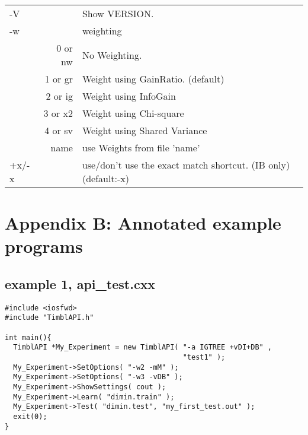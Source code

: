 \begin{tabular}{|l|r|l|}
-V & & Show VERSION. \\
-w &  & weighting \\
   & 0 or nw & No Weighting. \\
   & 1 or gr & Weight using GainRatio. (default) \\
   & 2 or ig & Weight using InfoGain \\
   & 3 or x2 & Weight using Chi-square \\
   & 4 or sv & Weight using Shared Variance \\
   & name & use Weights from file 'name' \\
+x/-x & & use/don't use the exact match shortcut.
 (IB only) (default:-x)\\
\hline
\end{tabular}

\clearpage
\section{Appendix B: Annotated example programs}

\subsection{example 1, api\_test.cxx}
\begin{verbatim}	
#include <iosfwd>
#include "TimblAPI.h"

int main(){
  TimblAPI *My_Experiment = new TimblAPI( "-a IGTREE +vDI+DB" , 
                                          "test1" );
  My_Experiment->SetOptions( "-w2 -mM" );
  My_Experiment->SetOptions( "-w3 -vDB" );
  My_Experiment->ShowSettings( cout );
  My_Experiment->Learn( "dimin.train" );  
  My_Experiment->Test( "dimin.test", "my_first_test.out" );  
  exit(0);
}

\end{verbatim}

